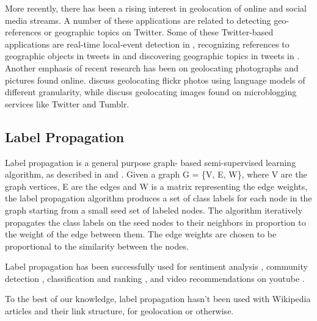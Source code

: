 \par More recently, there has been a rising interest in geolocation of online
and social media streams. A number of these applications are related to
detecting geo-references or geographic topics on Twitter. Some of these
Twitter-based applications are real-time local-event detection in
, recognizing references to geographic objects in
tweets in  and discovering geographic topics in tweets in
. Another emphasis of recent research has been on
geolocating photographs and pictures found online.
 discuss geolocating flickr photos using
language models of different granularity, while 
discuss geolocating images found on microblogging services like Twitter and
Tumblr.

\subsection{Label Propagation} 

Label propagation is a general purpose graph- based semi-supervised learning
algorithm, as described in  and .
Given a graph G = \{V, E, W\}, where V are the graph vertices, E are the edges
and W is a matrix representing the edge weights, the label propagation
algorithm produces a set of class labels for each node in the graph starting
from a small seed set of labeled nodes. The algorithm iteratively propagates
the class labels on the seed nodes to their neighbors in proportion to the
weight of the edge between them. The edge weights are chosen to be
proportional to the similarity between the nodes.

\par Label propagation has been successfully used for sentiment analysis
, community detection ,
classification and ranking , and video recommendations on
youtube .

\par To the best of our knowledge, label propagation hasn't been used with
Wikipedia articles and their link structure, for geolocation or otherwise.
